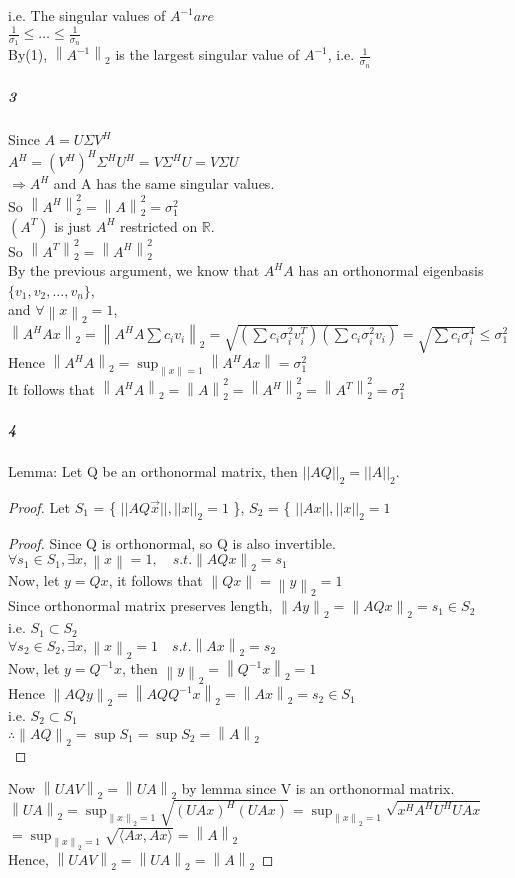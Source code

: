 \documentclass[10pt,letter]{article}
\newcommand\norm[1]{\left\lVert#1\right\rVert}
\begin{document}
i.e. The singular values of $A^{-1} are$ \\
$\frac{1}{\sigma_1}\leq\dots\leq\frac{1}{\sigma_n}$\\
By(1), $\norm{A^{-1}}_2$ is the largest singular value of $A^{-1}$, i.e. $\frac{1}{\sigma_n}$
\subparagraph{3}
Since $A=U\Sigma V^H$\\
$A^H=(V^H)^H\Sigma^HU^H=V\Sigma^HU=V\Sigma U$\\
$\Rightarrow A^H$ and A has the same singular values. \\
So $\norm{A^H}_2^2=\norm{A}_2^2=\sigma_1^2$\\
$(A^T)$ is just $A^H$ restricted on $\mathbb{R}$.\\
So $\norm{A^T}_2^2=\norm{A^H}_2^2$\\
By the previous argument, we know that $A^HA$ has an orthonormal eigenbasis $\{v_1, v_2, \dots,v_n \}$, \\
and $\forall \norm{x}_2=1$,   $\norm{A^HAx}_2=\norm{A^HA\sum c_iv_i}_2=\sqrt{(\sum c_i\sigma_i^2 v_i^T)(\sum c_i\sigma_i^2 v_i)}=\sqrt{\sum c_i\sigma_i^4}\leq \sigma_1^2$ \\
Hence $\norm{A^HA}_2=\sup_{\norm{x}=1}\norm{A^HAx}=\sigma_1^2$\\
It follows that $\norm{A^HA}_2=\norm{A}_2^2=\norm{A^H}_2^2=\norm{A^T}_2^2=\sigma_1^2$
\subparagraph{4}
Lemma: Let Q be an orthonormal matrix, then $||AQ||_{2} =  ||A||_{2}$.
\begin{proof}
	Let $S_{1}$ = \{ $||AQ\vec{x}||, ||x||_{2} = 1$ \},
	$S_{2}$  = \{ $||Ax||, ||x||_{2} = 1$
	\begin{proof}
		Since Q is orthonormal, so Q is also invertible.\\
		$\forall s_{1} \in S_{1}, \exists x, \norm{x}=1, \quad s.t. \norm{AQx}_2=s_1$\\
		Now, let $y=Qx$, it follows that $\norm{Qx}=\norm{y}_2=1$\\
		Since orthonormal matrix preserves length, $\norm{Ay}_2=\norm{AQx}_2=s_1\in S_2$\\
		i.e. $S_1\subset S_2$\\
		$\forall s_2\in S_2, \exists x, \norm{x}_2=1 \quad s.t. \norm{Ax}_2=s_2$\\
		Now, let $y=Q^{-1}x$, then $\norm{y}_2=\norm{Q^{-1}x}_2=1$\\
		Hence $\norm{AQy}_2=\norm{AQQ^{-1}x}_2=\norm{Ax}_2=s_2\in S_1$\\
		i.e. $S_2\subset S_1$\\
		$\therefore \norm{AQ}_2=\sup S_1=\sup S_2=\norm{A}_2$\\
	\end{proof}
Now $\norm{UAV}_2=\norm{UA}_2$ by lemma since V is an orthonormal matrix.\\
$\norm{UA}_2=\sup_{\norm{x}_2=1}\sqrt{(UAx)^H(UAx)}=\sup_{\norm{x}_2=1}\sqrt{x^HA^HU^HUAx}$\\
$=\sup_{\norm{x}_2=1}\sqrt{\langle Ax, Ax \rangle}=\norm{A}_2$\\
Hence, $\norm{UAV}_2=\norm{UA}_2=\norm{A}_2$
\end{proof}
\end{document}
